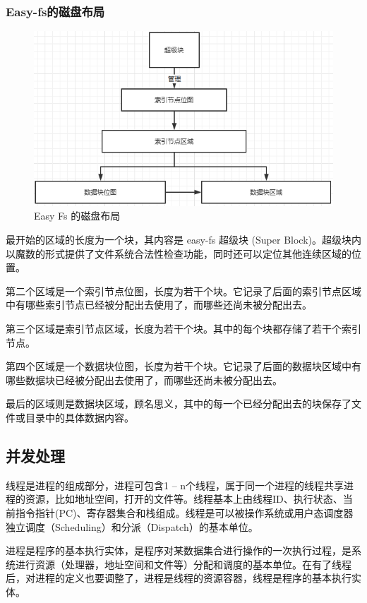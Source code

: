 \subsubsection{Easy-fs的磁盘布局}

\begin{figure}[htb]
    \figureCapSet
    \centering
    \includegraphics[width=.8\linewidth]{figure/c3/easyfsdevicemap.png}
    \caption{Easy Fs 的磁盘布局}
    \label{figure:c3easyfsdevicemap}
\end{figure}


最开始的区域的长度为一个块，其内容是 easy-fs 超级块 (Super Block)。超级块内以魔数的形式提供了文件系统合法性检查功能，同时还可以定位其他连续区域的位置。

第二个区域是一个索引节点位图，长度为若干个块。它记录了后面的索引节点区域中有哪些索引节点已经被分配出去使用了，而哪些还尚未被分配出去。

第三个区域是索引节点区域，长度为若干个块。其中的每个块都存储了若干个索引节点。

第四个区域是一个数据块位图，长度为若干个块。它记录了后面的数据块区域中有哪些数据块已经被分配出去使用了，而哪些还尚未被分配出去。

最后的区域则是数据块区域，顾名思义，其中的每一个已经分配出去的块保存了文件或目录中的具体数据内容。


\subsection{并发处理}

线程是进程的组成部分，进程可包含1 – n个线程，属于同一个进程的线程共享进程的资源，比如地址空间，打开的文件等。线程基本上由线程ID、执行状态、当前指令指针(PC)、寄存器集合和栈组成。线程是可以被操作系统或用户态调度器独立调度（Scheduling）和分派（Dispatch）的基本单位。

进程是程序的基本执行实体，是程序对某数据集合进行操作的一次执行过程，是系统进行资源（处理器，地址空间和文件等）分配和调度的基本单位。在有了线程后，对进程的定义也要调整了，进程是线程的资源容器，线程是程序的基本执行实体。

